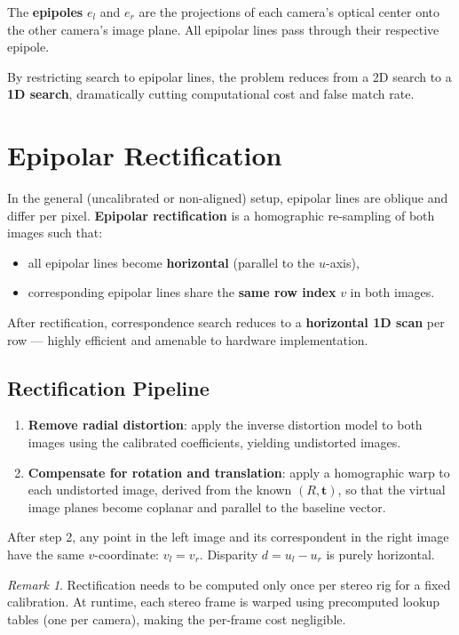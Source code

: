 \documentclass[11pt,a4paper]{article}
\theoremstyle{definition}
\theoremstyle{plain}
\theoremstyle{remark}
\newtheorem*{remark}{Remark}
\newcommand{\p}[1]{\mathbf{#1}}             %
\begin{document}
The \textbf{epipoles} $e_l$ and $e_r$ are the projections of each camera's optical center onto the other camera's image plane. All epipolar lines pass through their respective epipole.

By restricting search to epipolar lines, the problem reduces from a 2D search to a \textbf{1D search}, dramatically cutting computational cost and false match rate.

\section{Epipolar Rectification}

In the general (uncalibrated or non-aligned) setup, epipolar lines are oblique and differ per pixel. \textbf{Epipolar rectification} is a homographic re-sampling of both images such that:
\begin{itemize}
    \item all epipolar lines become \textbf{horizontal} (parallel to the $u$-axis),
    \item corresponding epipolar lines share the \textbf{same row index} $v$ in both images.
\end{itemize}

After rectification, correspondence search reduces to a \textbf{horizontal 1D scan} per row — highly efficient and amenable to hardware implementation.

\subsection{Rectification Pipeline}

\begin{enumerate}
    \item \textbf{Remove radial distortion}: apply the inverse distortion model to both images using the calibrated coefficients, yielding undistorted images.

    \item \textbf{Compensate for rotation and translation}: apply a homographic warp to each undistorted image, derived from the known $(R, \p{t})$, so that the virtual image planes become coplanar and parallel to the baseline vector.
\end{enumerate}

After step 2, any point in the left image and its correspondent in the right image have the same $v$-coordinate: $v_l = v_r$. Disparity $d = u_l - u_r$ is purely horizontal.

\begin{remark}
Rectification needs to be computed only once per stereo rig for a fixed calibration. At runtime, each stereo frame is warped using precomputed lookup tables (one per camera), making the per-frame cost negligible.
\end{remark}
\end{document}
